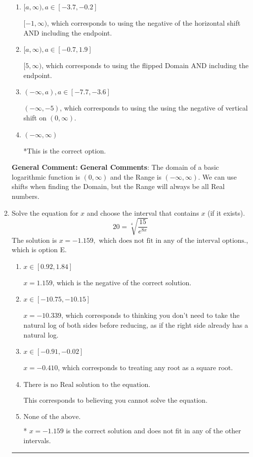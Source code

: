 \documentclass{extbook}[14pt]
\newcommand{\litem}[1]{\item #1

\rule{\textwidth}{0.4pt}}
\begin{document}
\begin{enumerate}
{\begin{enumerate}[label=\Alph*.]
$(-\infty, 5)$, which corresponds to using the vertical shift while the Range is $(-\infty, \infty)$.
\item \( [a, \infty), a \in [-3.7, -0.2] \)

$[-1, \infty)$, which corresponds to using the negative of the horizontal shift AND including the endpoint.
\item \( [a, \infty), a \in [-0.7, 1.9] \)

$[5, \infty)$, which corresponds to using the flipped Domain AND including the endpoint.
\item \( (-\infty, a), a \in [-7.7, -3.6] \)

$(-\infty, -5)$, which corresponds to using the using the negative of vertical shift on $(0, \infty)$.
\item \( (-\infty, \infty) \)

*This is the correct option.
\end{enumerate}

\textbf{General Comment:} \textbf{General Comments}: The domain of a basic logarithmic function is $(0, \infty)$ and the Range is $(-\infty, \infty)$. We can use shifts when finding the Domain, but the Range will always be all Real numbers.
}
\litem{
 Solve the equation for $x$ and choose the interval that contains $x$ (if it exists).
\[  20 = \sqrt[4]{\frac{15}{e^{8x}}} \]The solution is \( x = -1.159, \text{ which does not fit in any of the interval options.} \), which is option E.\begin{enumerate}[label=\Alph*.]
\item \( x \in [0.92, 1.84] \)

$x = 1.159$, which is the negative of the correct solution.
\item \( x \in [-10.75, -10.15] \)

$x = -10.339$, which corresponds to thinking you don't need to take the natural log of both sides before reducing, as if the right side already has a natural log.
\item \( x \in [-0.91, -0.02] \)

$x = -0.410$, which corresponds to treating any root as a square root.
\item \( \text{There is no Real solution to the equation.} \)

This corresponds to believing you cannot solve the equation.
\item \( \text{None of the above.} \)

* $x = -1.159$ is the correct solution and does not fit in any of the other intervals.
\end{enumerate}

}
\end{enumerate}
\end{document}
